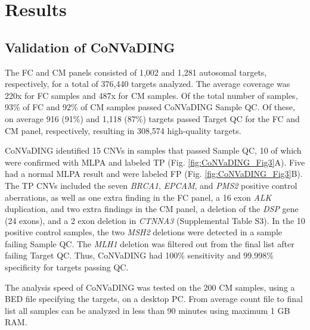 \section{Results}\label{results}

\subsection{Validation of CoNVaDING}
The FC and CM panels consisted of 1,002 and 1,281 autosomal targets, respectively, for a total of 376,440 targets analyzed. The average coverage was 220x for FC samples and 487x for CM samples. 
Of the total number of samples, 93\% of FC and 92\% of CM samples passed CoNVaDING Sample QC. 
Of these, on average 916 (91\%) and 1,118 (87\%) targets passed Target QC for the FC and CM panel, respectively, resulting in 308,574 high-quality targets. 

CoNVaDING identified 15 CNVs in samples that passed Sample QC, 10 of which were confirmed with MLPA and labeled TP (Fig. \ref{fig:CoNVaDING_Fig3}A). 
Five had a normal MLPA result and were labeled FP (Fig. \ref{fig:CoNVaDING_Fig3}B). 
The TP CNVs included the seven \textsl{BRCA1}, \textsl{EPCAM}, and \textsl{PMS2} positive control aberrations, as well as one extra finding in the FC panel, a 16 exon \textsl{ALK} duplication, and two extra findings in the CM panel, a deletion of the \textsl{DSP} gene (24 exons), and a 2 exon deletion in \textsl{CTNNA3} (Supplemental Table S3). 
In the 10 positive control samples, the two \textsl{MSH2} deletions were detected in a sample failing Sample QC. 
The \textsl{MLH1} deletion was filtered out from the final list after failing Target QC. 
Thus, CoNVaDING had 100\% sensitivity and 99.998\% specificity for targets passing QC. 

The analysis speed of CoNVaDING was tested on the 200 CM samples, using a BED file specifying the targets, on a desktop PC. 
From average count file to final list all samples can be analyzed in less than 90 minutes using maximum 1 GB RAM.

